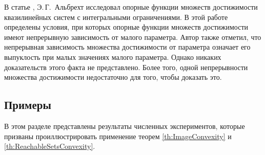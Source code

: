 \documentclass[../main.tex]{subfiles}
\begin{document}
\begin{zam}  
	В статье \cite{Albrecht2}, Э.\,Г.~Альбрехт исследовал опорные функции множеств достижимости квазилинейных систем с интегральными ограничениями. В этой работе определены условия, при которых опорные функции множеств достижимости имеют непрерывную зависимость от малого параметра.  Автор также отметил, что непрерывная зависимость множества достижимости от параметра означает его выпуклость при малых значениях малого параметра. Однако никаких доказательств этого факта не представлено. Более того, одной непрерывности множества достижимости недостаточно для того, чтобы доказать это.
\end{zam}

\subsection{Примеры}
\setcounter{equation}{0}

В этом разделе представлены результаты численных экспериментов, которые призваны проиллюстрировать применение теорем \ref{th:ImageConvexity} и \ref{th:ReachableSetsConvexity}. 
\end{document}
